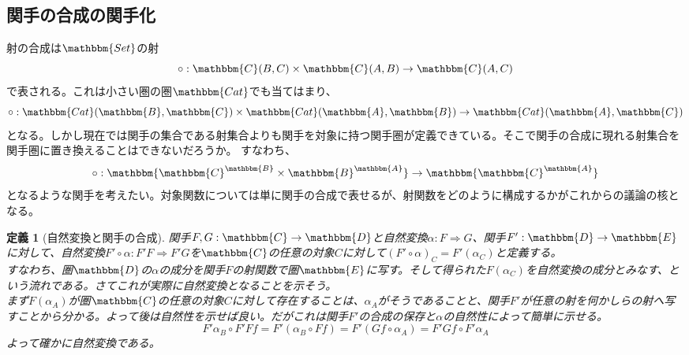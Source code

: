 \documentclass[uplatex,dvipdfmx]{jsarticle}
\newcommand{\cat}[1]{\mathbbm{#1}}
\newcommand{\arrow}{\rightarrow}
\newcommand{\functor}[3]{#1:\cat{#2}\arrow \cat{#3}}
\newcommand{\nat}[3]{#1:#2\Rightarrow #3}
\newcommand{\mor}[3]{#1:#2\arrow #3}
\newcommand{\arset}[3]{\cat{#1}(#2,#3)}
\newcommand{\funccat}[2]{\cat{#2}^\cat{#1}}
\newtheorem{define}[proof]{定義}
\numberwithin{proof}{subsection}
\begin{document}
  \subsection{関手の合成の関手化}
  射の合成は$\cat{Set}$の射\[\mor{\circ}{\arset{C}{B}{C}\times\arset{C}{A}{B}}{\arset{C}{A}{C}}\]で表される。これは小さい圏の圏$\cat{Cat}$でも当てはまり、\[\mor{\circ}{\arset{Cat}{\cat{B}}{\cat{C}}\times\arset{Cat}{\cat{A}}{\cat{B}}}{\arset{Cat}{\cat{A}}{\cat{C}}}\]となる。しかし現在では関手の集合である射集合よりも関手を対象に持つ関手圏が定義できている。そこで関手の合成に現れる射集合を関手圏に置き換えることはできないだろうか。
  すなわち、\[\functor{\circ}{\funccat{B}{C}\times\funccat{A}{B}}{\funccat{A}{C}}\]となるような関手を考えたい。対象関数については単に関手の合成で表せるが、射関数をどのように構成するかがこれからの議論の核となる。
  \begin{define}[自然変換と関手の合成]
    関手$\functor{F,G}{C}{D}$と自然変換$\nat{\alpha}{F}{G}$、関手$\functor{F'}{D}{E}$に対して、自然変換$\nat{F'\circ\alpha}{F'F}{F'G}$を$\cat{C}$の任意の対象$C$に対して$(F'\circ\alpha)_C=F'(\alpha_C)$と定義する。\\
    すなわち、圏$\cat{D}$の$\alpha$の成分を関手$F$の射関数で圏$\cat{E}$に写す。そして得られた$F(\alpha_C)$を自然変換の成分とみなす、という流れである。さてこれが実際に自然変換となることを示そう。\\
    まず$F(\alpha_A)$が圏$\cat{C}$の任意の対象$C$に対して存在することは、$\alpha_A$がそうであることと、関手$F'$が任意の射を何かしらの射へ写すことから分かる。よって後は自然性を示せば良い。だがこれは関手$F'$の合成の保存と$\alpha$の自然性によって簡単に示せる。
    \[F'\alpha_B\circ F'Ff=F'(\alpha_B\circ Ff)=F'(Gf\circ\alpha_A)=F'Gf\circ F'\alpha_A\]よって確かに自然変換である。
    \begin{center}
\end{center}
\end{define}
\end{document}
